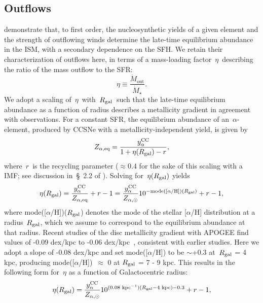 \subsection{Outflows} 
\label{migration:sec:methods:outflows} 
\citet{Weinberg2017b} demonstrate that, to first order, the nucleosynthetic 
yields of a given element and the strength of outflowing winds determine the 
late-time equilibrium abundance in the ISM, with a secondary dependence on the 
SFH. 
We retain their characterization of outflows here, in terms of a mass-loading 
factor~$\eta$~describing the ratio of the mass outflow to the SFR: 
\begin{equation} 
\eta \equiv \frac{\dot{M}_\text{out}}{\dot{M}_\star}. 
\end{equation} 
We adopt a scaling of~$\eta$~with~$R_\text{gal}$~such that the late-time 
equilibrium abundance as a function of radius describes a metallicity 
gradient in agreement with observations. 
For a constant SFR, the equilibrium abundance of an~$\alpha$-element, produced 
by CCSNe with a metallicity-independent yield, is given by 
\begin{equation} 
Z_{\alpha,\text{eq}} = \frac{y_\alpha^\text{CC}}{1 + \eta(R_\text{gal}) - r}, 
\end{equation} 
where~$r$~is the recycling parameter ($\approx$0.4 for the sake of this scaling 
with a~\citealp{Kroupa2001} IMF; see discussion in~\S~2.2 
of \citealp{Weinberg2017b}). Solving for~$\eta(R_\text{gal})$ yields 
\begin{equation} 
\eta(R_\text{gal}) = \frac{y_\alpha^\text{CC}}{Z_{\alpha,\text{eq}}} + r - 1 = 
\frac{y_\alpha^\text{CC}}{Z_{\alpha,\odot}}10^{-\text{mode([$\alpha$/H])}
(R_\text{gal})} + r - 1, 
\end{equation} 
where mode([$\alpha$/H])($R_\text{gal}$) denotes the mode of the stellar 
[$\alpha$/H] distribution at a radius~$R_\text{gal}$, which we assume to correspond 
to the equilibrium abundance at that radius. 
Recent studies of the disc metallicity gradient with APOGEE find values of 
-0.09 dex/kpc to -0.06 dex/kpc~\citep[e.g.][]{Frinchaboy2013, Hayden2014, 
Weinberg2019}, consistent with earlier studies. 
Here we adopt a slope of -0.08 dex/kpc and set mode([$\alpha$/H]) to be 
$\sim$+0.3 at~$R_\text{gal}$ = 4 kpc, producing mode([$\alpha$/H])~$\approx$ 0 at 
$R_\text{gal}$ = 7 - 9 kpc. This results in the following form for~$\eta$ as a 
function of Galactocentric radius: 
\begin{equation} 
\eta(R_\text{gal}) = \frac{y_\alpha^\text{CC}}{Z_{\alpha,\odot}} 
10^{(0.08\text{ kpc}^{-1})(R_\text{gal} - 4\text{ kpc}) - 0.3} + r - 1, 
\label{migration:eq:eta_rgal} 
\end{equation} 
